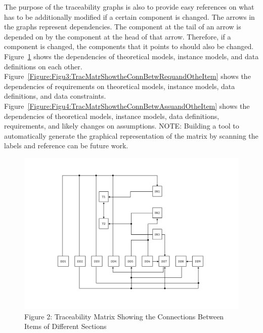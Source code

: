 \documentclass[12pt]{article}
\begin{document}
The purpose of the traceability graphs is also to provide easy references on what has to be additionally modified if a certain component is changed. The arrows in the graphs represent dependencies. The component at the tail of an arrow is depended on by the component at the head of that arrow. Therefore, if a component is changed, the components that it points to should also be changed. Figure~\ref{Figure:Figu2:TracMatrShowtheConnBetwItemofDiffSect} shows the dependencies of theoretical models, instance models, and data definitions on each other. Figure~\ref{Figure:Figu3:TracMatrShowtheConnBetwRequandOtheItem} shows the dependencies of requirements on theoretical models, instance models, data definitions, and data constraints. Figure~\ref{Figure:Figu4:TracMatrShowtheConnBetwAssuandOtheItem} shows the dependencies of theoretical models, instance models, data definitions, requirements, and likely changes on assumptions.
NOTE: Building a tool to automatically generate the graphical representation of the matrix by scanning the labels and reference can be future work.
\begin{figure}
\begin{center}
\includegraphics[width=\textwidth]{../../../datafiles/GlassBR/Trace.png}
\caption{Figure 2: Traceability Matrix Showing the Connections Between Items of Different Sections}
\label{Figure:Figu2:TracMatrShowtheConnBetwItemofDiffSect}
\end{center}
\end{figure}
\end{document}
